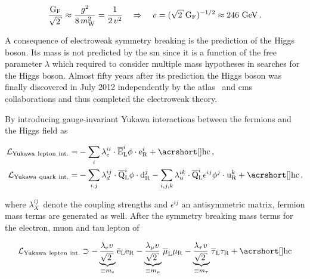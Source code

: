 \begin{equation}
\frac{\mathrm{G}_\mathrm{F}}{\sqrt{2}}\approx\frac{g^2}{8\,m_\mathrm{W}^{2}}=\frac{1}{2\,v^2}
\quad\Rightarrow\quad v=(\sqrt{2}\,\mathrm{G}_\mathrm{F})^{-1/2}\approx 246~\GeV\,.
\end{equation}
 
A consequence of electroweak symmetry breaking is the prediction of the Higgs boson. Its mass is not predicted by the \gls{sm} since it is a function of the free parameter $\lambda$ which required to consider multiple mass hypotheses in searches for the Higgs boson. Almost fifty years after its prediction the Higgs boson was finally discovered in July 2012 independently by the \gls{atlas}~\cite{Aad:2012tfa} and \gls{cms}~\cite{Chatrchyan:2012xdj} collaborations and thus completed the electroweak theory. 


By introducing gauge-invariant Yukawa interactions between the fermions and the Higgs field as 

\begin{subequations}
\begin{align}
\mathcal{L}_\mathrm{Yukawa~lepton~int.}=&-\sum_{i}\lambda_{e}^{ii}\cdot\bar{\mathrm{E}}^{i}_\mathrm{L}\phi\cdot\mathrm{e}^{i}_\mathrm{R}+\mathrm{\gls{hc}}\,, \label{eq:theory-lepton-yukawa}\\
\mathcal{L}_\mathrm{Yukawa~quark~int.}=&-\sum_{i,j}\lambda_{d}^{ij}\cdot\bar{\mathrm{Q}}^{i}_\mathrm{L}\phi\cdot\mathrm{d}^{j}_\mathrm{R}-\sum_{i,j,k}\lambda_{u}^{ik}\cdot\bar{\mathrm{Q}}^{i}_\mathrm{L}\epsilon^{ij}\phi^{j}\cdot\mathrm{u}^{k}_\mathrm{R} +\mathrm{\gls{hc}}\,, \label{eq:theory-quark-yukawa}
\end{align}
\end{subequations}

where $\lambda_{X}^{ij}\,$  denote the coupling strengths and $\epsilon^{ij}$ an antisymmetric matrix, fermion mass terms are generated as well. After the symmetry breaking mass terms for the electron, muon and tau lepton of 

\begin{equation}
\mathcal{L}_\mathrm{Yukawa~lepton~int.}\supset-\underbrace{\frac{\lambda_\mathrm{e} v}{\sqrt{2}}\,}_{\equiv m_\mathrm{e}}\bar{\mathrm{e}}_\mathrm{L}\mathrm{e}_\mathrm{R}-\underbrace{\frac{\lambda_{\mu} v}{\sqrt{2}}\,}_{\equiv m_{\mu}}\bar{\mu}_\mathrm{L}{\mu}_\mathrm{R}-\underbrace{\frac{\lambda_{\tau} v}{\sqrt{2}}\,}_{\equiv m_{\tau}}\bar{\tau}_\mathrm{L}{\tau}_\mathrm{R}+\mathrm{\gls{hc}}
\end{equation}

